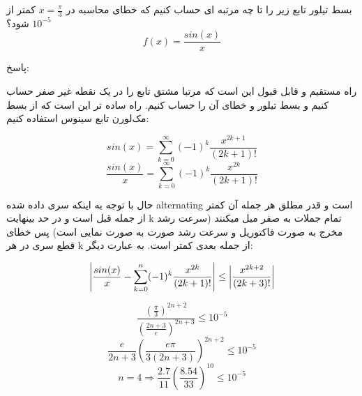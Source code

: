 بسط تیلور تابع زیر را تا چه مرتبه ای حساب کنیم که خطای محاسبه در $x= \frac{\pi}{3}$ کمتر از $10^{-5}$ شود؟
$$f(x) = \frac{sin(x)}{x}$$

پاسخ:

راه مستقیم و قابل قبول این است که مرتبا مشتق تابع را در یک نقطه غیر صفر حساب کنیم و بسط تیلور و خطای آن را حساب کنیم.
راه ساده تر این است که از بسط مک‌لورن تابع سینوس استفاده کنیم:

$$sin(x) = \sum_{k=0}^{\infty} (-1)^k \frac{x^{2k+1}}{(2k+1)!}$$
$$\frac{sin(x)}{x} = \sum_{k=0}^{\infty} (-1)^k \frac{x^{2k}}{(2k+1)!}$$

حال با توجه به اینکه سری داده شده alternating است و قدر مطلق هر جمله آن کمتر از جمله قبل است و در حد بینهایت k تمام جملات به صفر میل میکنند (سرعت رشد مخرج به صورت فاکتوریل و سرعت رشد صورت به صورت نمایی است) پس خطای قطع سری در هر k از جمله بعدی کمتر است. به عبارت دیگر:

$$\abs{\frac{sin(x)}{x} - \sum_{k=0}^{n} (-1)^k \frac{x^{2k}}{(2k+1)!}} \leq \abs{\frac{x^{2k+2}}{(2k+3)!}}$$

$$\frac{(\frac{\pi}{3})^{2n+2}}{(\frac{2n+3}{e})^{2n+3}} \leq 10^{-5}$$
$$\frac{e}{2n+3} (\frac{e\pi}{3(2n+3)})^{2n+2} \leq 10^{-5}$$
$$n = 4 \Rightarrow \frac{2.7}{11} (\frac{8.54}{33})^{10} \leq 10^{-5}$$
